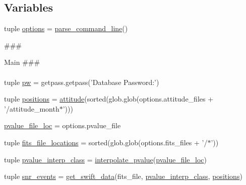 \subsection*{Variables}
\begin{DoxyCompactItemize}
\item 
tuple \hyperlink{namespaceswift__upload_a4d388713f6a0d16328488675c4d482a3}{options} = \hyperlink{namespaceswift__upload_afb3aeedcd6324609616af510e7d5ab77}{parse\-\_\-command\-\_\-line}()
\begin{DoxyCompactList}\small\item\em \begin{DoxyVerb}                        ###
\end{DoxyVerb}
 Main \#\#\# \paragraph*{}\end{DoxyCompactList}\item 
tuple \hyperlink{namespaceswift__upload_ae6ff833c36ee2cf47e509afe217a0617}{pw} = getpass.\-getpass('Database Password\-:')
\item 
tuple \hyperlink{namespaceswift__upload_a377519eb5588b9332f113754e4baa783}{positions} = \hyperlink{classswift__upload_1_1attitude}{attitude}(sorted(glob.\-glob(options.\-attitude\-\_\-files + '/attitude\-\_\-month$\ast$')))
\item 
\hyperlink{namespaceswift__upload_abd11718745781fc3b22a4e8afb312c7b}{pvalue\-\_\-file\-\_\-loc} = options.\-pvalue\-\_\-file
\item 
tuple \hyperlink{namespaceswift__upload_a3a9f04e4f02ad4c7b5626cee4d2888e8}{fits\-\_\-file\-\_\-locations} = sorted(glob.\-glob(options.\-fits\-\_\-files + '/$\ast$'))
\item 
tuple \hyperlink{namespaceswift__upload_a47786733b71afff4100ce30a5522235e}{pvalue\-\_\-interp\-\_\-class} = \hyperlink{namespaceswift__upload_afd59363e3ba6ebbf496eba54eb48deab}{interpolate\-\_\-pvalue}(\hyperlink{namespaceswift__upload_abd11718745781fc3b22a4e8afb312c7b}{pvalue\-\_\-file\-\_\-loc})
\item 
tuple \hyperlink{namespaceswift__upload_aa7b8b09b55bc451f3bf4383f952dbe80}{snr\-\_\-events} = \hyperlink{namespaceswift__upload_a9d72a96223b34f720ff10ded383a85f4}{get\-\_\-swift\-\_\-data}(fits\-\_\-file, \hyperlink{namespaceswift__upload_a47786733b71afff4100ce30a5522235e}{pvalue\-\_\-interp\-\_\-class}, \hyperlink{namespaceswift__upload_a377519eb5588b9332f113754e4baa783}{positions})
\end{DoxyCompactItemize}


